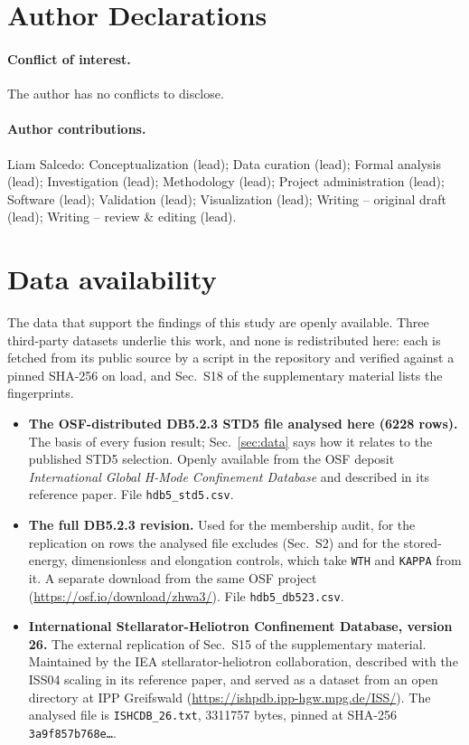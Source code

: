 \documentclass[aip,pop,preprint,amsmath,amssymb]{revtex4-2}
\begin{document}
\section*{Author Declarations}

\paragraph*{Conflict of interest.}
The author has no conflicts to disclose.

\paragraph*{Author contributions.}
Liam Salcedo: Conceptualization (lead); Data curation (lead); Formal analysis
(lead); Investigation (lead); Methodology (lead); Project administration (lead);
Software (lead); Validation (lead); Visualization (lead); Writing -- original
draft (lead); Writing -- review \& editing (lead).

\section*{Data availability}

The data that support the findings of this study are openly available. Three
third-party datasets underlie this work, and none is redistributed here: each is
fetched from its public source by a script in the repository and verified
against a pinned SHA-256 on load, and Sec.~S18 of the supplementary material
lists the fingerprints.

\begin{itemize}\setlength{\itemsep}{2pt}
\item \textbf{The OSF-distributed DB5.2.3 STD5 file analysed here (6228
rows).} The basis of every fusion result; Sec.~\ref{sec:data} says how it
relates to the published STD5 selection. Openly available from the OSF deposit
\emph{International Global H-Mode Confinement Database}\cite{osfdb} and
described in its reference paper\cite{hdb5}. File \texttt{hdb5\_std5.csv}.
\item \textbf{The full DB5.2.3 revision.} Used for the membership audit, for
the replication on rows the analysed file excludes (Sec.~S2) and for the stored-energy, dimensionless and elongation
controls, which take \texttt{WTH} and \texttt{KAPPA} from it. A separate
download from the same OSF project\cite{osfdb}
(\url{https://osf.io/download/zhwa3/}). File
\texttt{hdb5\_db523.csv}.
\item \textbf{International Stellarator-Heliotron Confinement Database,
version 26.} The external replication of Sec.~S15 of the supplementary
material. Maintained by the IEA stellarator-heliotron collaboration, described
with the ISS04 scaling in its reference paper\cite{iss04}, and served as a
dataset\cite{ishcdbdata} from an open directory at IPP Greifswald
(\url{https://ishpdb.ipp-hgw.mpg.de/ISS/}). The
analysed file is \texttt{ISHCDB\_26.txt}, 3311757 bytes, pinned at SHA-256
\texttt{3a9f857b768e\ldots}.
\end{itemize}
\end{document}
